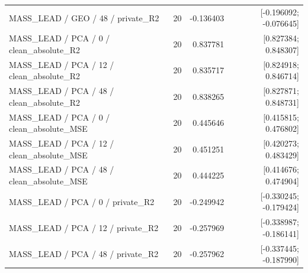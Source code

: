 \begin{longtable}{p{.56\linewidth}rrr}
MASS\_LEAD / GEO / 48 / private\_R2 & 20 & -0.136403 & [-0.196092; -0.076645] \\
MASS\_LEAD / PCA / 0 / clean\_absolute\_R2 & 20 & 0.837781 & [0.827384; 0.848307] \\
MASS\_LEAD / PCA / 12 / clean\_absolute\_R2 & 20 & 0.835717 & [0.824918; 0.846714] \\
MASS\_LEAD / PCA / 48 / clean\_absolute\_R2 & 20 & 0.838265 & [0.827871; 0.848731] \\
MASS\_LEAD / PCA / 0 / clean\_absolute\_MSE & 20 & 0.445646 & [0.415815; 0.476802] \\
MASS\_LEAD / PCA / 12 / clean\_absolute\_MSE & 20 & 0.451251 & [0.420273; 0.483429] \\
MASS\_LEAD / PCA / 48 / clean\_absolute\_MSE & 20 & 0.444225 & [0.414676; 0.474904] \\
MASS\_LEAD / PCA / 0 / private\_R2 & 20 & -0.249942 & [-0.330245; -0.179424] \\
MASS\_LEAD / PCA / 12 / private\_R2 & 20 & -0.257969 & [-0.338987; -0.186141] \\
MASS\_LEAD / PCA / 48 / private\_R2 & 20 & -0.257962 & [-0.337445; -0.187990] \\
\bottomrule\end{longtable}
